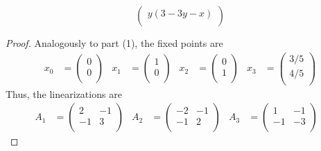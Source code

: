 \documentclass[../psets.tex]{subfiles}
\begin{document}
\begin{enumerate}
\begin{enumerate}
\begin{equation*}
\begin{pmatrix}
                y(3-3y-x)\\
            \end{pmatrix}
        \end{equation*}
        \begin{proof}
            Analogously to part (1), the fixed points are
            \begin{align*}
                x_0 &=
                \begin{pmatrix}
                    0\\
                    0\\
                \end{pmatrix}&
                x_1 &=
                \begin{pmatrix}
                    1\\
                    0\\
                \end{pmatrix}&
                x_2 &=
                \begin{pmatrix}
                    0\\
                    1\\
                \end{pmatrix}&
                x_3 &=
                \begin{pmatrix}
                    3/5\\
                    4/5\\
                \end{pmatrix}
            \end{align*}
            Thus, the linearizations are
            \begin{align*}
                A_1 &=
                \begin{pmatrix}
                    2 & -1\\
                    -1 & 3\\
                \end{pmatrix}&
                A_2 &=
                \begin{pmatrix}
                    -2 & -1\\
                    -1 & 2\\
                \end{pmatrix}&
                A_3 &=
                \begin{pmatrix}
                    1 & -1\\
                    -1 & -3\\
                \end{pmatrix}&

\end{align*}
\end{proof}
\end{enumerate}
\end{enumerate}
\end{document}

